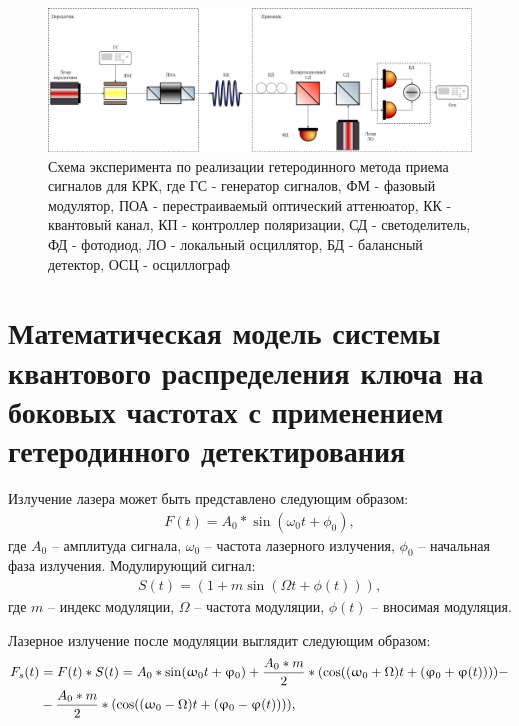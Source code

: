 \begin{figure}
    \centering
    \includegraphics[width = \linewidth]{images/Гетеродин схема новая2 .png}
    \caption{Схема эксперимента по реализации гетеродинного метода приема сигналов для КРК, где ГС - генератор сигналов, ФМ - фазовый модулятор, ПОА - перестраиваемый оптический аттенюатор, КК - квантовый канал, КП - контроллер поляризации, СД - светоделитель, ФД - фотодиод, ЛО - локальный осциллятор, БД - балансный детектор, ОСЦ - осциллограф}
    \label{fig:het true ch3}
\end{figure}
\section{Математическая модель системы квантового распределения ключа на боковых частотах с применением гетеродинного детектирования}\label{sec:ch3/sect4}
Излучение лазера может быть представлено следующим образом:
\begin{align}
F(t) = A_0 * \sin(\omega_0 t + \phi_0),
\end{align}
где $A_0$ -- амплитуда сигнала, $\omega_0$ -- частота лазерного излучения, $\phi_0$ -- начальная фаза излучения.
Модулирующий сигнал:
\begin{align}
S(t) = (1+ m\sin(\Omega t  + \phi (t))),
\end{align} 
где $m$ -- индекс модуляции, $\Omega$ -- частота модуляции, $\phi (t)$ -- вносимая модуляция.

Лазерное излучение после модуляции выглядит следующим образом:
\begin{align}
\label{eq:laser_het}
F_s(t) &= F(t) * S(t) = A_0 * \sin(\omega_0 t + \phi_0) + \frac{A_0 * m}{2} * (\cos((\omega_0 + \Omega)t + (\phi_0 + \phi (t)))) - \notag \\
&- \frac{A_0 * m}{2} * (\cos((\omega_0 - \Omega)t + (\phi_0 - \phi (t)))),
\end{align}

